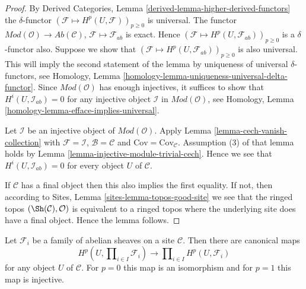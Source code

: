 \begin{proof}
By
Derived Categories, Lemma \ref{derived-lemma-higher-derived-functors}
the $\delta$-functor $(\mathcal{F} \mapsto H^p(U, \mathcal{F}))_{p \geq 0}$
is universal. The functor
$\textit{Mod}(\mathcal{O}) \to \textit{Ab}(\mathcal{C})$,
$\mathcal{F} \mapsto \mathcal{F}_{ab}$ is exact. Hence
$(\mathcal{F} \mapsto H^p(U, \mathcal{F}_{ab}))_{p \geq 0}$
is a $\delta$-functor also. Suppose we show that
$(\mathcal{F} \mapsto H^p(U, \mathcal{F}_{ab}))_{p \geq 0}$
is also universal. This will imply the second statement of the lemma
by uniqueness of universal $\delta$-functors, see
Homology, Lemma \ref{homology-lemma-uniqueness-universal-delta-functor}.
Since $\textit{Mod}(\mathcal{O})$ has enough injectives,
it suffices to show that $H^i(U, \mathcal{I}_{ab}) = 0$
for any injective object $\mathcal{I}$ in $\textit{Mod}(\mathcal{O})$, see
Homology, Lemma \ref{homology-lemma-efface-implies-universal}.

\medskip\noindent
Let $\mathcal{I}$ be an injective object of $\textit{Mod}(\mathcal{O})$.
Apply Lemma \ref{lemma-cech-vanish-collection}
with $\mathcal{F} = \mathcal{I}$, $\mathcal{B} = \mathcal{C}$
and $\text{Cov} = \text{Cov}_\mathcal{C}$.
Assumption (3) of that lemma holds by
Lemma \ref{lemma-injective-module-trivial-cech}.
Hence we see that $H^i(U, \mathcal{I}_{ab}) = 0$
for every object $U$ of $\mathcal{C}$.

\medskip\noindent
If $\mathcal{C}$ has a final
object then this also implies the first equality. If not, then
according to Sites, Lemma \ref{sites-lemma-topos-good-site} we see that
the ringed topos $(\Sh(\mathcal{C}), \mathcal{O})$ is equivalent to a
ringed topos where the underlying site does have a final object.
Hence the lemma follows.
\end{proof}

\begin{lemma}
\label{lemma-cohomology-products}
Let $\mathcal{F}_i$ be a family of abelian sheaves on a site $\mathcal{C}$.
Then there are canonical maps
$$
H^p(U, \prod\nolimits_{i \in I} \mathcal{F}_i)
\longrightarrow
\prod\nolimits_{i \in I} H^p(U, \mathcal{F}_i)
$$
for any object $U$ of $\mathcal{C}$. For $p = 0$ this map is
an isomorphism and for $p = 1$ this map is injective.
\end{lemma}

